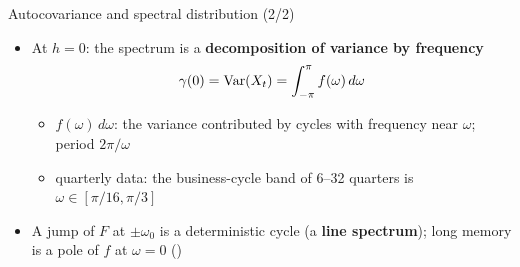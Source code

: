 \begin{frame}{Autocovariance and spectral distribution (2/2)}
\itemsize{\small}
\begin{itemize}
    \item At $h = 0$: the spectrum is a \textbf{decomposition of variance by frequency}
    \[ \gamma(0) = \text{Var}(X_t) = \int_{-\pi}^{\pi}f(\omega)\,d\omega \]
    \begin{itemize}
        \item $f(\omega)\,d\omega$: the variance contributed by cycles with frequency near $\omega$; period $2\pi/\omega$
        \item quarterly data: the business-cycle band of 6--32 quarters is $\omega \in [\pi/16, \pi/3]$
    \end{itemize}
    \item A jump of $F$ at $\pm\omega_0$ is a deterministic cycle (a \textbf{line spectrum}); long memory is a pole of $f$ at $\omega = 0$ ()
\end{itemize}
\end{frame}

